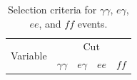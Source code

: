 \documentclass[dissertation.tex]{subfiles}
\begin{document}
\begin{table}[hcbp]
\caption{Selection criteria for $\gamma\gamma$, $e\gamma$, $ee$, and $\mathit{ff}$ events.}
\centering
\begin{tabular}{|c|c|c|c|c|}
\hline
\multirow{2}{*}{Variable} & \multicolumn{4}{c|}{Cut} \\
\cline{2-5}
& $\gamma\gamma$ & $e\gamma$ & $ee$ & $\mathit{ff}$ \\
\hline
\hline

\end{tabular}
\end{table}
\end{document}
